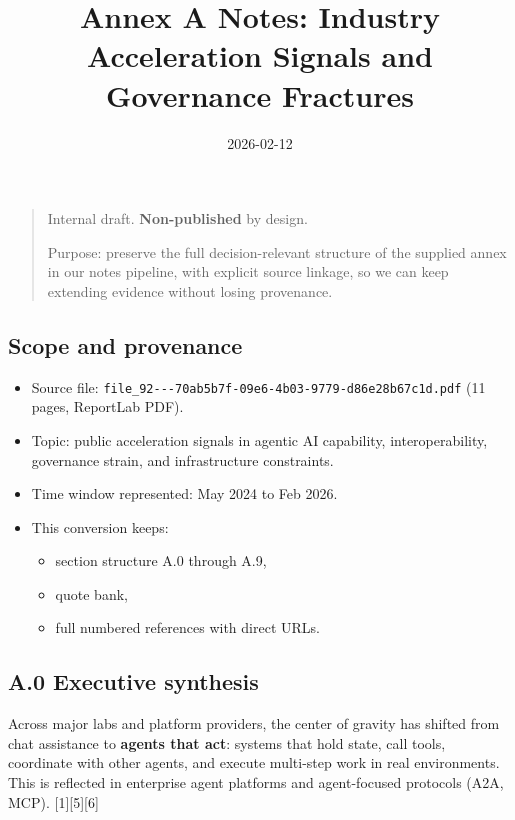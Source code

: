 \documentclass[
]{article}
\title{Annex A Notes: Industry Acceleration Signals and Governance
Fractures}
\author{}
\date{2026-02-12}
\providecommand{\tightlist}{%
  \setlength{\itemsep}{0pt}\setlength{\parskip}{0pt}}
\begin{document}
\maketitle

\begin{quote}
Internal draft. \textbf{Non-published} by design.

Purpose: preserve the full decision-relevant structure of the supplied
annex in our notes pipeline, with explicit source linkage, so we can
keep extending evidence without losing provenance.
\end{quote}

\hypertarget{scope-and-provenance}{%
\subsection{Scope and provenance}\label{scope-and-provenance}}

\begin{itemize}
\tightlist
\item
  Source file:
  \texttt{file\_92-\/-\/-70ab5b7f-09e6-4b03-9779-d86e28b67c1d.pdf} (11
  pages, ReportLab PDF).
\item
  Topic: public acceleration signals in agentic AI capability,
  interoperability, governance strain, and infrastructure constraints.
\item
  Time window represented: May 2024 to Feb 2026.
\item
  This conversion keeps:

  \begin{itemize}
  \tightlist
  \item
    section structure A.0 through A.9,
  \item
    quote bank,
  \item
    full numbered references with direct URLs.
  \end{itemize}
\end{itemize}

\hypertarget{a.0-executive-synthesis}{%
\subsection{A.0 Executive synthesis}\label{a.0-executive-synthesis}}

Across major labs and platform providers, the center of gravity has
shifted from chat assistance to \textbf{agents that act}: systems that
hold state, call tools, coordinate with other agents, and execute
multi-step work in real environments. This is reflected in enterprise
agent platforms and agent-focused protocols (A2A, MCP).
{[}1{]}{[}5{]}{[}6{]}
\end{document}
